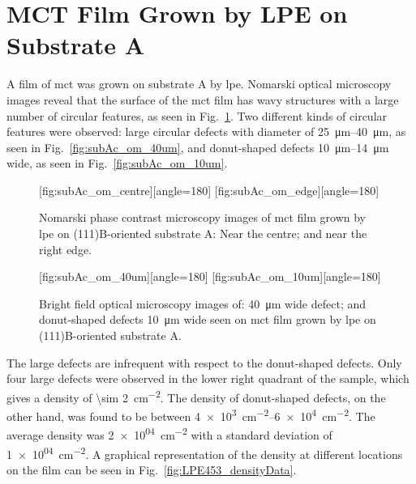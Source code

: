 \clearpage
\section{MCT Film Grown by LPE on Substrate A}\label{sec:subAc}

A film of \acl{mct} was grown on substrate A by \ac{lpe}. Nomarski optical microscopy images reveal that the surface of the \ac{mct} film has wavy structures with a large number of circular features, as seen in Fig.~\ref{fig:subAc_om}. Two different kinds of circular features were observed: large circular defects with diameter of \SIrange{25}{40}{\micro\metre}, as seen in Fig.~\ref{fig:subAc_om_40um}, and donut-shaped defects \SIrange{10}{14}{\micro\metre} wide, as seen in Fig.~\ref{fig:subAc_om_10um}.

\begin{figure}[htbp]
    \centering
    [fig:subAc_om_centre][angle=180]
    \hfill
    [fig:subAc_om_edge][angle=180]
    \caption[Nomarski phase contrast microscopy images of \ac{mct} film grown by \ac{lpe} on substrate A.]{Nomarski phase contrast microscopy images of \ac{mct} film grown by \ac{lpe} on (111)B-oriented substrate A:  Near the centre; and  near the right edge.}
    \label{fig:subAc_om}
\end{figure}

\begin{figure}[htbp]
    \centering
    [fig:subAc_om_40um][angle=180]
    \hfill
    [fig:subAc_om_10um][angle=180]
    \caption[Bright field optical microscopy images of defects seen on \ac{mct} film grown by \ac{lpe} on substrate A.]{Bright field optical microscopy images of:  \SI{40}{\micro\metre} wide defect; and  donut-shaped defects \SI{10}{\micro\metre} wide seen on \ac{mct} film grown by \ac{lpe} on (111)B-oriented substrate A.}
    \label{fig:subAc_om_40umand10um}
\end{figure}

The large defects are infrequent with respect to the donut-shaped defects. Only four large defects were observed in the lower right quadrant of the sample, which gives a density of \SI{\sim 2}{\centi\metre^{-2}}. The density of donut-shaped defects, on the other hand, was found to be between \SIrange{4e+3}{6e+4}{\centi\metre^{-2}}. The average density was \SI{2e+04}{\centi\metre^{-2}} with a standard deviation of \SI{1e+04}{\centi\metre^{-2}}. A graphical representation of the density at different locations on the film can be seen in Fig.~\ref{fig:LPE453_densityData}. 

